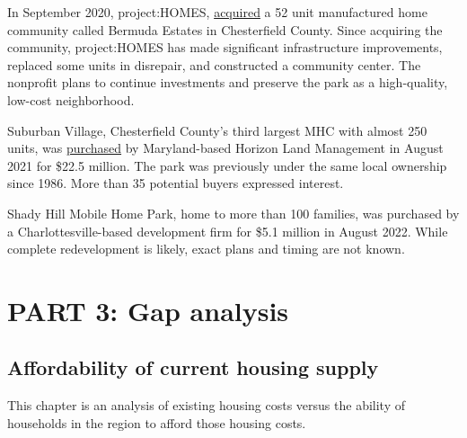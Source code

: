 \documentclass[
  letterpaper,
  DIV=11,
  numbers=noendperiod]{scrreprt}
\begin{document}
\begin{tcolorbox}[enhanced jigsaw, colframe=quarto-callout-tip-color-frame, arc=.35mm, bottomrule=.15mm, colbacktitle=quarto-callout-tip-color!10!white, opacityback=0, left=2mm, rightrule=.15mm, title=\textcolor{quarto-callout-tip-color}{\faLightbulb}\hspace{0.5em}{Notable changes since 2020}, colback=white, coltitle=black, toptitle=1mm, leftrule=.75mm, titlerule=0mm, breakable, opacitybacktitle=0.6, toprule=.15mm, bottomtitle=1mm]

In September 2020, project:HOMES,
\href{https://www.projecthomes.org/bermuda-estates}{acquired} a 52 unit
manufactured home community called Bermuda Estates in Chesterfield
County. Since acquiring the community, project:HOMES has made
significant infrastructure improvements, replaced some units in
disrepair, and constructed a community center. The nonprofit plans to
continue investments and preserve the park as a high-quality, low-cost
neighborhood.

Suburban Village, Chesterfield County's third largest MHC with almost
250 units, was
\href{https://richmond.com/news/local/maryland-based-investment-firm-buys-chesterfield-mobile-home-park-for-22-5-million/article_41bd2656-0466-5643-9285-2715e88fee40.html}{purchased}
by Maryland-based Horizon Land Management in August 2021 for \$22.5
million. The park was previously under the same local ownership since
1986. More than 35 potential buyers expressed interest.

Shady Hill Mobile Home Park, home to more than 100 families, was
purchased by a Charlottesville-based development firm for \$5.1 million
in August 2022. While complete redevelopment is likely, exact plans and
timing are not known.

\end{tcolorbox}

\part{PART 3: Gap analysis}

\hypertarget{part-3-1}{%
\chapter{Affordability of current housing supply}\label{part-3-1}}

This chapter is an analysis of existing housing costs versus the ability
of households in the region to afford those housing costs.
\end{document}
